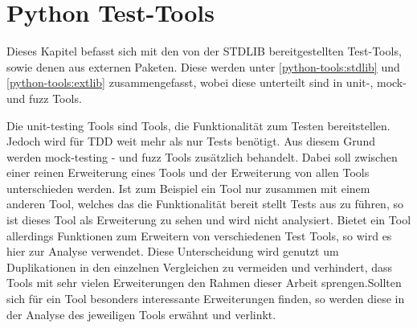 \section{Python Test-Tools}\label{python-tools}

Dieses Kapitel befasst sich mit den von der STDLIB bereitgestellten Test-Tools,
sowie denen aus externen Paketen.
Diese werden unter \ref{python-tools:stdlib} und \ref{python-tools:extlib}
zusammengefasst, wobei diese unterteilt sind in unit-,
\gls{mock}- und \gls{fuzz} Tools.

Die unit-testing Tools sind Tools, die Funktionalität zum Testen bereitstellen.
Jedoch wird für TDD weit mehr als nur Tests benötigt. Aus diesem Grund werden
\gls{mock}-testing - und \gls{fuzz} Tools zusätzlich behandelt. Dabei soll
zwischen einer reinen Erweiterung eines Tools und der Erweiterung von allen
Tools unterschieden werden. Ist zum Beispiel ein Tool nur zusammen mit einem
anderen Tool, welches das die Funktionalität bereit stellt Tests aus zu führen,
so ist dieses Tool als Erweiterung zu sehen und wird nicht analysiert. Bietet
ein Tool allerdings Funktionen zum Erweitern von verschiedenen Test Tools, so
wird es hier zur  Analyse verwendet. Diese Unterscheidung wird genutzt um
Duplikationen in den einzelnen Vergleichen zu vermeiden und verhindert, dass
Tools mit sehr vielen Erweiterungen den Rahmen dieser Arbeit sprengen.Sollten
sich für ein Tool besonders interessante \textsl{}Erweiterungen finden, so 
werden diese
in der Analyse des jeweiligen Tools erwähnt und verlinkt.
\newline

